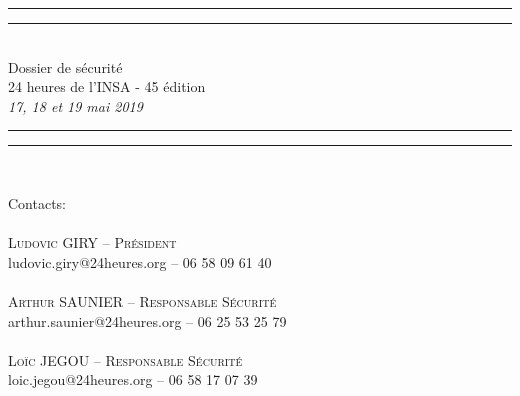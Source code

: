 \documentclass[hidelinks, paper=a4, fontsize=13pt]{report}
\begin{document}

\begin{center}
\rule[0.5ex]{\linewidth}{2pt}\vspace*{-\baselineskip}\vspace*{4.2pt}
\rule[0.5ex]{\linewidth}{1pt}\\[\baselineskip]
\huge Dossier de sécurité\\24 heures de l'INSA - 45 édition \\[4mm]
{\Large \textit{17, 18 et 19 mai 2019}}\\
\rule[0.5ex]{\linewidth}{1pt}\vspace*{-\baselineskip}\vspace{3.2pt}
\rule[0.5ex]{\linewidth}{2pt}\\
\vspace{20mm}
\end{center}
{\large Contacts:}\\
\vspace{3.5mm}
{\large\textsc{\\
Ludovic GIRY – Président\\}
ludovic.giry@24heures.org  – 06 58 09 61 40\\\\\textsc{
Arthur SAUNIER – Responsable Sécurité\\}
arthur.saunier@24heures.org – 06 25 53 25 79\\\\\textsc{
Loïc JEGOU – Responsable Sécurité\\}
loic.jegou@24heures.org  – 06 58 17 07 39\\\\}\\
\vspace{20mm}
\end{document}
